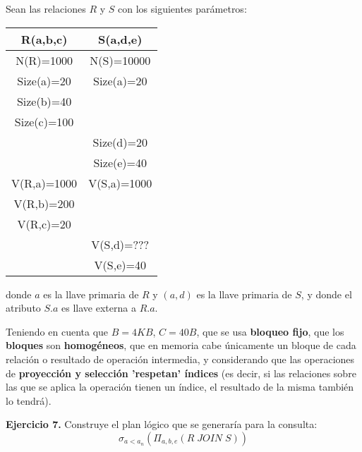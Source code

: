 \documentclass[12pt]{report}
\begin{document}
Sean las relaciones $R$ y $S$ con los siguientes parámetros:

\begin{center}
\begin{tabular}{|c|c|}
\hline 
R(a,b,c) & S(a,d,e) \\ 
\hline 
N(R)=1000 & N(S)=10000 \\ 
\hline 
Size(a)=20 & Size(a)=20 \\ 
\hline 
Size(b)=40 &   \\ 
\hline 
Size(c)=100 &   \\ 
\hline 
  & Size(d)=20 \\ 
\hline 
  & Size(e)=40 \\ 
\hline 
V(R,a)=1000 & V(S,a)=1000 \\ 
\hline 
V(R,b)=200 &   \\ 
\hline 
V(R,c)=20 &   \\ 
\hline 
  & V(S,d)=??? \\ 
\hline 
  & V(S,e)=40 \\ 
\hline 
\end{tabular} 
\end{center}
donde $a$ es la llave primaria de $R$ y $(a,d)$ es la llave primaria de $S$, y donde el atributo $S.a$ es llave externa a $R.a$.


Teniendo en cuenta que $B=4KB$, $C=40B$, que se usa \textbf{bloqueo fijo}, que los \textbf{bloques} son \textbf{homogéneos}, que en memoria cabe únicamente un bloque de cada relación o resultado de operación intermedia, y considerando que las operaciones de \textbf{proyección y selección 'respetan' índices} (es decir, si las relaciones sobre las que se aplica la operación tienen un índice, el resultado de la misma también lo tendrá).

\textbf{Ejercicio 7.} Construye el plan lógico que se generaría para la consulta:
\[
\sigma_{a<a_n}\left(\Pi_{a,b,e}\left(R\;JOIN\;S\right)\right)
\]

\begin{center}
\end{center}
\end{document}
